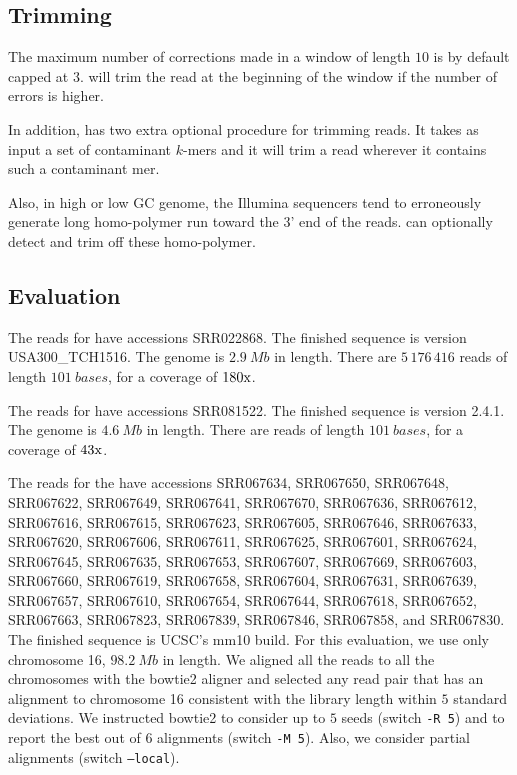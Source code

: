 \documentclass[10pt]{bmc_article}
\newenvironment{bmcformat}{\fussy\setboolean{publ}{true}}{\fussy}
\begin{document}
\begin{bmcformat}
\subsection*{Trimming}
\label{sec:meth-trimming}
The maximum number of corrections made in a window of length $10$ is by default capped at $3$.
\quorum will trim the read at the beginning of the window if the number of errors is higher.

In addition, \quorum has two extra optional procedure for trimming reads. 
It takes as input a set of contaminant $k$-mers and it will trim a read wherever it contains such a contaminant mer.

Also, in high or low GC genome, the Illumina sequencers tend to erroneously generate long homo-polymer run toward the 3' end of the reads.
\quorum can optionally detect and trim off these homo-polymer.


\subsection*{Evaluation}

The reads for  have accessions SRR022868.
The finished sequence is version USA300\_TCH1516.
The genome is $\SI{2.9}{Mb}$ in length.
There are $5\,176\,416$ reads of length $\SI{101}{bases}$, for a coverage of $180\textrm{x}$.

The reads for  have accessions SRR081522.
The finished sequence is version 2.4.1.
The genome is $\SI{4.6}{Mb}$ in length.
There are  reads of length $\SI{101}{bases}$, for a coverage of $43\textrm{x}$.

The reads for the  have accessions SRR067634, SRR067650, SRR067648, SRR067622, SRR067649, SRR067641, SRR067670, SRR067636, SRR067612, SRR067616, SRR067615, SRR067623, SRR067605, SRR067646, SRR067633, SRR067620, SRR067606, SRR067611, SRR067625, SRR067601, SRR067624, SRR067645, SRR067635, SRR067653, SRR067607, SRR067669, SRR067603, SRR067660, SRR067619, SRR067658, SRR067604, SRR067631, SRR067639, SRR067657, SRR067610, SRR067654, SRR067644, SRR067618, SRR067652, SRR067663, SRR067823, SRR067839, SRR067846, SRR067858, and SRR067830.
The finished sequence is UCSC's mm10 build.
For this evaluation, we use only chromosome 16, $\SI{98.2}{Mb}$ in length.
We aligned all the reads to all the chromosomes with the bowtie2 aligner and selected any read pair that has an alignment to chromosome 16 consistent with the library length within $5$ standard deviations.
We instructed bowtie2 to consider up to $5$ seeds (switch {\tt -R 5}) and to report the best out of $6$ alignments (switch {\tt -M 5}).
Also, we consider partial alignments (switch {\tt --local}).


\end{bmcformat}
\end{document}
